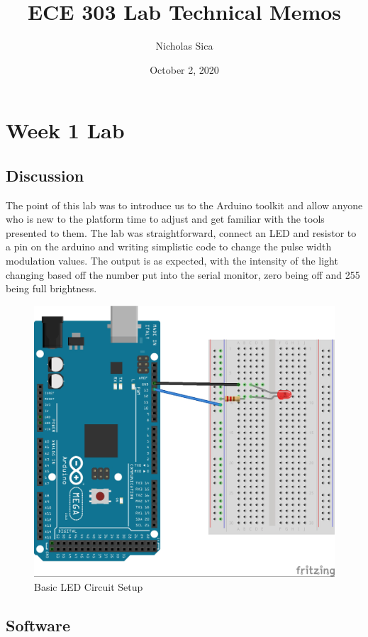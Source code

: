 \documentclass[12pt,titlepage]{article}
\begin{document}
\title{ECE 303 Lab Technical Memos}
\author{Nicholas Sica}
\date{October 2, 2020}
\maketitle

\tableofcontents
\newpage

\section{Week 1 Lab}
\subsection{Discussion}
The point of this lab was to introduce us to the Arduino toolkit and allow anyone who is new to the platform time to adjust and get familiar with the tools presented to them. The lab was straightforward, connect an LED and resistor to a pin on the arduino and writing simplistic code to change the pulse width modulation values. The output is as expected, with the intensity of the light changing based off the number put into the serial monitor, zero being off and 255 being full brightness.
\begin{figure}[!htb]
  \centering
  \includegraphics[width=5.0in]{figure_1_1.png}
  \caption{Basic LED Circuit Setup}\label{fig:lab_2}
\end{figure}
\subsection{Software}
\begin{minipage}{\linewidth}
  
\end{minipage}
\newpage
\end{document}
